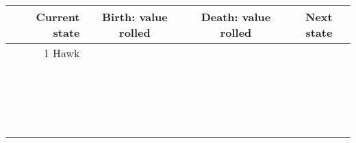 \documentclass{article}
\begin{document}
\newpage

\begin{center}
    \begin{tabular}{r|c|c|c}
        \toprule
        Current state & Birth: value rolled & Death: value rolled & Next state \\
        \midrule
        1 Hawk        &                    &                     &            \\
                      &                    &                     &            \\
                      &                    &                     &            \\
                      &                    &                     &            \\
                      &                    &                     &            \\
                      &                    &                     &            \\
                      &                    &                     &            \\
                      &                    &                     &            \\
                      &                    &                     &            \\
                      &                    &                     &            \\
                      &                    &                     &            \\
                      &                    &                     &            \\
                      &                    &                     &            \\
                      &                    &                     &            \\
                      &                    &                     &            \\
                      &                    &                     &            \\
                      &                    &                     &            \\
                      &                    &                     &            \\
                      &                    &                     &            \\

\end{tabular}
\end{center}
\end{document}
